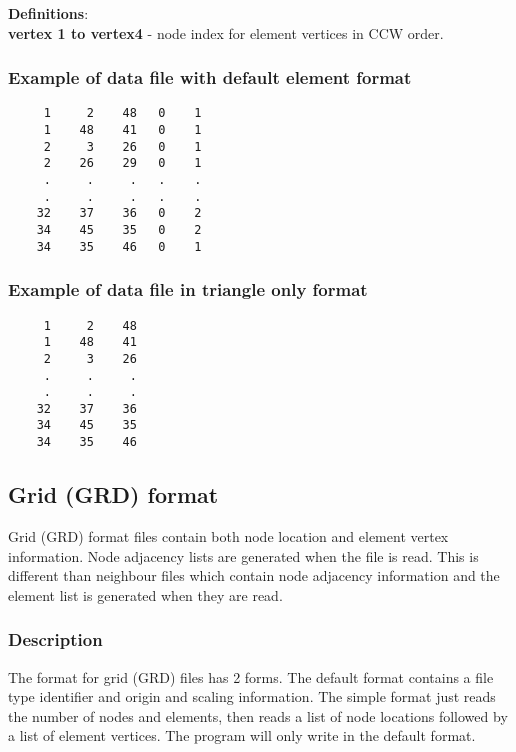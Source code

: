 \documentclass{article}
\begin{document}
\noindent\textbf{Definitions}:\\ 

\noindent
\textbf{vertex 1 to vertex4} - node index for element vertices in CCW order. \\


\subsubsection{Example of data file with default element format}
\begin{small}
\begin{lstlisting}
     1     2    48   0    1
     1    48    41   0    1
     2     3    26   0    1
     2    26    29   0    1
     .     .     .   .    .
     .     .     .   .    .
    32    37    36   0    2
    34    45    35   0    2
    34    35    46   0    1
\end{lstlisting}
\end{small}

\subsubsection{Example of data file in triangle only format}
\begin{small}
\begin{lstlisting}
     1     2    48
     1    48    41
     2     3    26
     .     .     .
     .     .     .
    32    37    36
    34    45    35
    34    35    46
\end{lstlisting}
\end{small}

\newpage
\subsection[Grid (GRD) format]{Grid (GRD) format}

Grid (GRD) format files contain both node location and element vertex information. Node adjacency lists are
generated when the file is read. This is different than neighbour files which contain node adjacency
information and the element list is generated when they are read.

\subsubsection[Description]{Description}

The format for grid (GRD) files has 2 forms. The default format contains a file type identifier and origin and
scaling information. The simple format just reads the number of nodes and elements, then reads a list of
node locations followed by a list of element vertices. The program will  only write in the default format.\\
\end{document}

